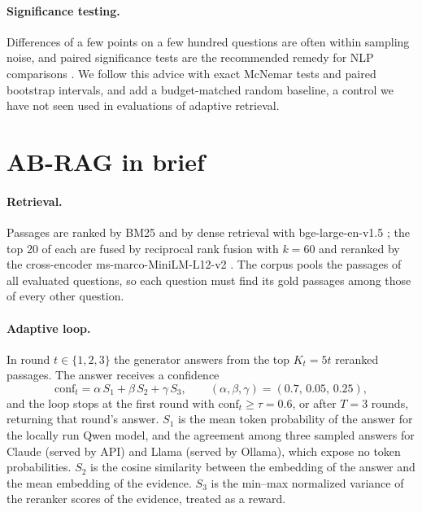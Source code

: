 \documentclass[11pt]{article}
\begin{document}
\paragraph{Significance testing.} Differences of a few points on a few hundred questions are often within sampling noise, and paired significance tests are the recommended remedy for NLP comparisons \citep{bergkirkpatrick2012empirical,dror2018hitchhiker}. We follow this advice with exact McNemar tests and paired bootstrap intervals, and add a budget-matched random baseline, a control we have not seen used in evaluations of adaptive retrieval.

\section{AB-RAG in brief}
\label{sec:abrag}

\paragraph{Retrieval.} Passages are ranked by BM25 \citep{robertson2009bm25} and by dense retrieval with bge-large-en-v1.5 \citep{xiao2023cpack}; the top 20 of each are fused by reciprocal rank fusion with $k=60$ \citep{cormack2009rrf} and reranked by the cross-encoder ms-marco-MiniLM-L12-v2 \citep{wang2020minilm,nogueira2019passage}. The corpus pools the passages of all evaluated questions, so each question must find its gold passages among those of every other question.

\paragraph{Adaptive loop.} In round $t \in \{1,2,3\}$ the generator answers from the top $K_t = 5t$ reranked passages. The answer receives a confidence
\begin{equation}
\mathrm{conf}_t = \alpha\, S_1 + \beta\, S_2 + \gamma\, S_3, \qquad (\alpha,\beta,\gamma) = (0.7,\, 0.05,\, 0.25),
\end{equation}
and the loop stops at the first round with $\mathrm{conf}_t \ge \tau = 0.6$, or after $T=3$ rounds, returning that round's answer. $S_1$ is the mean token probability of the answer for the locally run Qwen model, and the agreement among three sampled answers for Claude (served by API) and Llama (served by Ollama), which expose no token probabilities. $S_2$ is the cosine similarity between the embedding of the answer and the mean embedding of the evidence. $S_3$ is the min--max normalized variance of the reranker scores of the evidence, treated as a reward.
\end{document}
